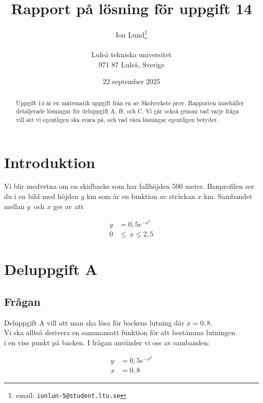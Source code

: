 \documentclass[a4paper,12pt]{article}
\title{Rapport på lösning för uppgift 14}
\author{Ion Lund\thanks{email:
        \texttt{ionlun-5@student.ltu.se}}\\  
        ~ \\
        Luleå tekniska universitet \\ 
        971 87 Luleå, Sverige}
\date{22 september 2025}
\begin{document}
\linenumbers %

\maketitle

\begin{abstract}

  Uppgift 14 är en matematik uppgift från en av Skolverkets prov.
  \cite{Skolverk} Rapporten innehåller detaljerade lösningar för deluppgift 
  A, B, och C. Vi går också genom vad varje fråga vill att vi egentligen ska 
  svara på, och vad våra lösningar egentligen betyder.
\end{abstract}

\section{Introduktion}
\label{sec:introduktion}

  Vi blir medvetna om en skidbacke som har fallhöjden 500 meter. Banprofilen 
  ser du i en bild med höjden $y$ km som är en funktion av sträckan $x$ km.
  \cite{Skolverk} Sambandet mellan $y$ och $x$ ges av att 

  \begin{align}
    y &= 0,5e^{-x^2} \nonumber 
    \\
    0 &\le~x \le 2,5 \nonumber
  \end{align}

\section{Deluppgift A}

\label{sec:uppg1}

  \subsection{Frågan}

    Deluppgift A \cite{Skolverk} vill att man ska lösa för backens lutning där
    $x = 0,8$.
    \\
    Vi ska alltså derivera en sammansatt funktion för att bestämma lutningen 
    \\
    i en viss punkt på backen. I frågan använder vi oss av sambanden:

    \begin{align}
      y &= 0,5e^{-x^2} \nonumber 
      \\
      x &= 0,8 \nonumber
    \end{align}
\end{document}
